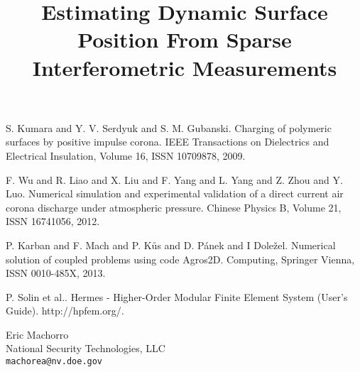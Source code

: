 \documentclass[article,A4,11pt]{llncs}%
\begin{document}

\begin{thebibliography}{10}
{\sc S. Kumara and Y. V. Serdyuk and S. M. Gubanski}. {Charging of polymeric surfaces by positive impulse corona}. IEEE Transactions on Dielectrics and Electrical Insulation, Volume 16, ISSN 10709878, 2009.

{\sc F. Wu and R. Liao and X. Liu and F. Yang and L. Yang and Z. Zhou and Y. Luo}. {Numerical simulation and experimental validation of a direct current air corona discharge under atmospheric pressure}. Chinese Physics B, Volume 21, ISSN 16741056, 2012.

{\sc P. Karban and F. Mach and P. K\r{u}s and D. P\'{a}nek and I Dole\v{z}el}. {Numerical solution of coupled problems using code Agros2D}. Computing, Springer Vienna, ISSN 0010-485X, 2013.

{\sc P. Solin et al.}. {Hermes - Higher-Order Modular Finite Element System (User's Guide)}. http://hpfem.org/.
\end{thebibliography}

\title{Estimating Dynamic Surface Position From Sparse Interferometric Measurements}
 \author{} \institute{}
\maketitle
\begin{center}
{\large Eric Machorro}\\
National Security Technologies, LLC\\
{\tt machorea@nv.doe.gov}
\end{center}
\end{document}
